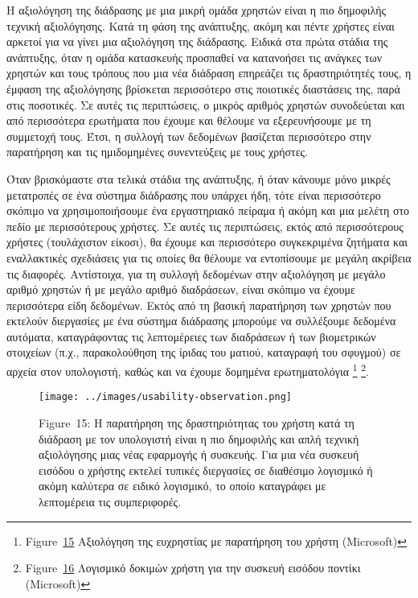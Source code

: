 \documentclass[
]{article}
\begin{document}
Η αξιολόγηση της διάδρασης με μια μικρή ομάδα χρηστών είναι η πιο
δημοφιλής τεχνική αξιολόγησης. Κατά τη φάση της ανάπτυξης, ακόμη και
πέντε χρήστες είναι αρκετοί για να γίνει μια αξιολόγηση της διάδρασης.
Ειδικά στα πρώτα στάδια της ανάπτυξης, όταν η ομάδα κατασκευής προσπαθεί
να κατανοήσει τις ανάγκες των χρηστών και τους τρόπους που μια νέα
διάδραση επηρεάζει τις δραστηριότητές τους, η έμφαση της αξιολόγησης
βρίσκεται περισσότερο στις ποιοτικές διαστάσεις της, παρά στις
ποσοτικές. Σε αυτές τις περιπτώσεις, ο μικρός αριθμός χρηστών
συνοδεύεται και από περισσότερα ερωτήματα που έχουμε και θέλουμε να
εξερευνήσουμε με τη συμμετοχή τους. Έτσι, η συλλογή των δεδομένων
βασίζεται περισσότερο στην παρατήρηση και τις ημιδομημένες συνεντεύξεις
με τους χρήστες.

Όταν βρισκόμαστε στα τελικά στάδια της ανάπτυξης, ή όταν κάνουμε μόνο
μικρές μετατροπές σε ένα σύστημα διάδρασης που υπάρχει ήδη, τότε είναι
περισσότερο σκόπιμο να χρησιμοποιήσουμε ένα εργαστηριακό πείραμα ή ακόμη
και μια μελέτη στο πεδίο με περισσότερους χρήστες. Σε αυτές τις
περιπτώσεις, εκτός από περισσότερους χρήστες (τουλάχιστον είκοσι), θα
έχουμε και περισσότερο συγκεκριμένα ζητήματα και εναλλακτικές σχεδιάσεις
για τις οποίες θα θέλουμε να εντοπίσουμε με μεγάλη ακρίβεια τις
διαφορές. Αντίστοιχα, για τη συλλογή δεδομένων στην αξιολόγηση με μεγάλο
αριθμό χρηστών ή με μεγάλο αριθμό διαδράσεων, είναι σκόπιμο να έχουμε
περισσότερα είδη δεδομένων. Εκτός από τη βασική παρατήρηση των χρηστών
που εκτελούν διεργασίες με ένα σύστημα διάδρασης μπορούμε να συλλέξουμε
δεδομένα αυτόματα, καταγράφοντας τις λεπτομέρειες των διαδράσεων ή των
βιομετρικών στοιχείων (π.χ., παρακολούθηση της ίριδας του ματιού,
καταγραφή του σφυγμού) σε αρχεία στον υπολογιστή, καθώς και να έχουμε
δομημένα ερωτηματολόγια \footnote{Figure~\protect\hyperlink{fig:usability-observation}{15}
  Αξιολόγηση της ευχρηστίας με παρατήρηση του χρήστη (Microsoft)}
\footnote{Figure~\protect\hyperlink{fig:mouse-test-software}{16}
  Λογισμικό δοκιμών χρήστη για την συσκευή εισόδου ποντίκι (Microsoft)}.

\leavevmode{}%
\begin{figure}
\hypertarget{fig:usability-observation}{%
\centering
\texttt{[image: ../images/usability-observation.png]}
\caption{Figure~15: Η παρατήρηση της δραστηριότητας του χρήστη κατά τη
διάδραση με τον υπολογιστή είναι η πιο δημοφιλής και απλή τεχνική
αξιολόγησης μιας νέας εφαρμογής ή συσκευής. Για μια νέα συσκευή εισόδου
ο χρήστης εκτελεί τυπικές διεργασίες σε διαθέσιμο λογισμικό ή ακόμη
καλύτερα σε ειδικό λογισμικό, το οποίο καταγράφει με λεπτομέρεια τις
συμπεριφορές.}\label{fig:usability-observation}
}
\end{figure}
\end{document}
